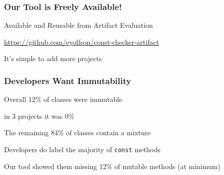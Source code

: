 \documentclass[aspectratio=169]{beamer}
\begin{document}
  \begin{frame}
    \frametitle{Our Tool is Freely Available!}

    Available and Reusable from Artifact Evaluation

    \vspace{2em}

    \url{https://github.com/eyolfson/const-checker-artifact}

    \vspace{2em}

    It's simple to add more projects
  \end{frame}

  \begin{frame}
    \frametitle{Developers Want Immutability}

    Overall 12\% of classes were immutable

    \hspace{1em} in 3 projects it was 0\%

    \vspace{1em}

    The remaining 84\% of classes contain a mixture

    \vspace{1em}


    \vspace{4em}

    Developers do label the majority of \texttt{const} methods

    \hspace{1em} Our tool showed them missing 12\% of mutable methods (at
                 minimum)

    \vspace{1em}

  \end{frame}
\end{document}
